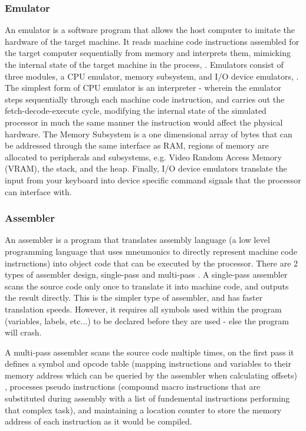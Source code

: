 \subsubsection{Emulator}
\label{sec:Emulator}
An emulator is a software program that allows the host computer to imitate the hardware of the target machine. It reads machine code instructions assembled for the target computer sequentially from memory and interprets them, mimicking the internal state of the target machine in the process, \textcite{CHIP-8-blog}. Emulators consist of three modules, a CPU emulator, memory subsystem, and I/O device emulators, \textcite{retroreversing}. The simplest form of CPU emulator is an interpreter - wherein the emulator steps sequentially through each machine code instruction, and carries out the fetch-decode-execute cycle, modifying the internal state of the simulated processor in much the same manner the instruction would affect the physical hardware. The Memory Subsystem is a one dimensional array of bytes that can be addressed through the same interface as RAM, regions of memory are allocated to peripherals and subsystems, e.g. Video Random Access Memory (VRAM), the stack, and the heap. Finally, I/O device emulators translate the input from your keyboard into device specific command signals that the processor can interface with.

\subsubsection{Assembler}
\label{sec:Assembler}
An assembler is a program that translates assembly language (a low level programming language that uses mneumonics to directly represent machine code instructions) into object code that can be executed by the processor. There are 2 types of assembler design, single-pass and multi-pass \textcite{TOPPR-assembler}. A single-pass assembler scans the source code only once to translate it into machine code, and outputs the result directly. This is the simpler type of assembler, and has faster translation speeds. However, it requires all symbols used within the program (variables, labels, etc...) to be declared before they are used - else the program will crash. 

A multi-pass assembler scans the source code multiple times, on the first pass it defines a symbol and opcode table (mapping instructions and variables to their memory address which can be queried by the assembler when calculating offsets) \textcite{TOPPR-assembler}, processes pseudo instructions (compound macro instructions that are substituted during assembly with a list of fundemental instructions performing that complex task), and maintaining a location counter to store the memory address of each instruction as it would be compiled.


